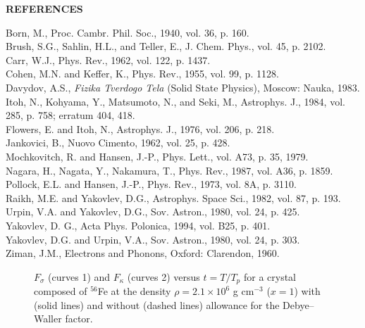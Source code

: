 \newpage
\begin{center}
                   {\bf REFERENCES}
\end{center}
\noindent
Born, M., Proc. Cambr. Phil. Soc., 1940, vol. 36, p. 160.\\
Brush, S.G., Sahlin, H.L., and Teller, E., J. Chem. Phys., vol.
45, p. 2102.\\
Carr, W.J., Phys. Rev., 1962, vol. 122, p. 1437.\\
Cohen, M.N. and Keffer, K., Phys. Rev., 1955, vol. 99, p. 1128.\\
Davydov, A.S., {\it Fizika Tverdogo Tela} (Solid State Physics),
Moscow: Nauka, 1983.\\
Itoh, N., Kohyama, Y., Matsumoto, N., and Seki, M., Astrophys. J.,
1984, vol. 285, p. 758; erratum 404, 418.\\
Flowers, E. and Itoh, N., Astrophys. J., 1976, vol. 206, p. 218.\\
Jankovici, B., Nuovo Cimento, 1962, vol. 25, p. 428.\\
Mochkovitch, R. and Hansen, J.-P., Phys. Lett., vol. A73, p. 35,
1979.\\
Nagara, H., Nagata, Y., Nakamura, T., Phys. Rev., 1987, vol. A36,
p. 1859.\\
Pollock, E.L. and Hansen, J.-P., Phys. Rev., 1973, vol. 8A, p.
3110.\\
Raikh, M.E. and Yakovlev, D.G., Astrophys. Space Sci., 1982, vol.
87, p. 193.\\
Urpin, V.A. and Yakovlev, D.G., Sov. Astron., 1980, vol. 24, p.
425.\\
Yakovlev, D. G., Acta Phys. Polonica, 1994, vol. B25, p. 401.\\
Yakovlev, D.G. and Urpin, V.A., Sov. Astron., 1980, vol. 24, p.
303.\\
Ziman, J.M., Electrons and Phonons, Oxford: Clarendon, 1960.\\

\newpage



\begin{figure}[t]
\hsize
\centerline{{}}
\caption{\label{figure1}
$F_\sigma$ (curves 1) and $F_\kappa$ (curves 2) versus
$t = T/T_p$ for a crystal composed of $^{56}$Fe
at the density $\rho = 2.1 \times 10^6$  g cm$^{-3}$ ($x=1$) 
with (solid lines) and without (dashed lines) allowance for 
the Debye--Waller factor.
}
\end{figure}

\newpage



